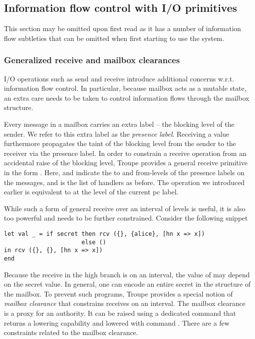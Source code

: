 \subsection{Information flow control with I/O primitives}
This section may be omitted upon first read as it has a number of information flow subtleties that 
can be omitted when first starting to use the system.
\subsubsection{Generalized receive and mailbox clearances}

I/O operations such as send and receive introduce additional concerns w.r.t. 
information flow control. In particular, because mailbox acts as a mutable state, an extra
care needs to be taken to control information flows through the mailbox structure.


Every message in a mailbox carries an extra label -- the blocking level of the sender. We refer to this 
extra label as the \emph{presence label}.
Receiving a value furthermore propagates the taint of the blocking level from the sender to the receiver via the presence label. 
In order to constrain a receive operation from an accidental raise of the blocking level, Troupe
provides a general receive primitive in the form 
. Here,  and 
indicate the to and from-levels of the presence labels on the messages, and  is the list of 
handlers as before.
The  operation we introduced earlier is equivalent to 
at the level of the current pc label.

While such a form of general receive over an interval of levels is useful, it is also too powerful 
and needs to be further constrained. Consider the following snippet


\begin{lstlisting}
let val _ = if secret then rcv ({}, {alice}, [hn x => x])
                      else ()
in rcv ({}, {}, [hn x => x])
end
\end{lstlisting}

Because the receive in the high branch is on an interval, the value of  may 
depend on the secret value. In general, one can encode an entire secret in the structure 
of the mailbox. To prevent such programs, Troupe provides a special notion of \emph{mailbox clearance}
that constrains receives on an interval. The mailbox clearance is a proxy for an authority. 
It can be raised using a dedicated command  that returns a lowering
capability and lowered with command . 
There are a few constraints related to the mailbox clearance.

